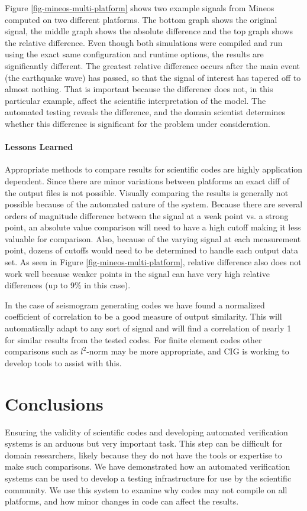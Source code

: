 \documentclass{acm_proc_article-sp}
\begin{document}
Figure \ref{fig-mineos-multi-platform} shows two example signals from Mineos computed on two different platforms.  The bottom graph shows the original signal, the middle graph shows the absolute difference and the top graph shows the relative difference.  Even though both simulations were compiled and run using the exact same configuration and runtime options, the results are significantly different.  The greatest relative difference occurs after the main event (the earthquake wave) has passed, so that the signal of interest has tapered off to almost nothing. That is important because the difference does not, in this particular example, affect the scientific interpretation of the model. The automated testing reveals the difference, and the domain scientist determines whether this difference is significant for the problem under consideration.

\paragraph*{Lessons Learned}
Appropriate methods to compare results for scientific codes are highly application dependent. Since there are minor variations between platforms an exact diff of the output files is not possible. Visually comparing the results is generally not possible because of the automated nature of the system.  Because there are several orders of magnitude difference between the signal at a weak point vs. a strong point, an absolute value comparison will need to have a high cutoff making it less valuable for comparison.  Also, because of the varying signal at each measurement point, dozens of cutoffs would need to be determined to handle each output data set.  As seen in Figure \ref{fig-mineos-multi-platform}, relative difference also does not work well because weaker points in the signal can have very high relative differences (up to 9\% in this case).

In the case of seismogram generating codes we have found a normalized coefficient of correlation to be a good measure of output similarity.  This will automatically adapt to any sort of signal and will find a correlation of nearly 1 for similar results from the tested codes.  For finite element codes other comparisons such as $l^2$-norm may be more appropriate, and CIG is working to develop tools to assist with this. 

\section{Conclusions}
\label{sec-conclusions}
Ensuring the validity of scientific codes and developing automated verification systems is an arduous but very important task. This step can be difficult for domain researchers, likely because they do not have the tools or expertise to make such comparisons. We have demonstrated how an automated verification systems can be used to develop a testing infrastructure for use by the scientific community. We use this system to examine why codes may not compile on all platforms, and how minor changes in code can affect the results.



\end{document}
